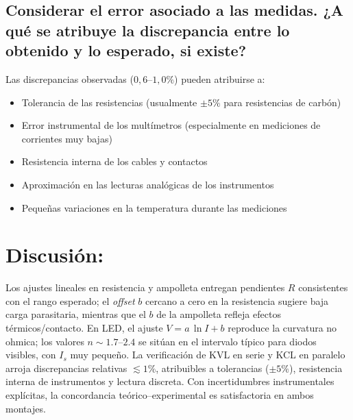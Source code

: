 \documentclass[11pt,twocolumn]{article}
\begin{document}
\subsection{Considerar el error asociado a las medidas. ¿A qué se atribuye la discrepancia entre lo obtenido y lo esperado, si existe?}

Las discrepancias observadas ($0,6$--$1,0\%$) pueden atribuirse a:
\begin{itemize}
\item Tolerancia de las resistencias (usualmente $\pm5\%$ para resistencias de carbón)
\item Error instrumental de los multímetros (especialmente en mediciones de corrientes muy bajas)
\item Resistencia interna de los cables y contactos
\item Aproximación en las lecturas analógicas de los instrumentos
\item Pequeñas variaciones en la temperatura durante las mediciones
\end{itemize}


\section{Discusión:}

Los ajustes lineales en resistencia y ampolleta entregan pendientes $R$ consistentes con el rango esperado; el \emph{offset} $b$ cercano a cero en la resistencia sugiere baja carga parasitaria, mientras que el $b$ de la ampolleta refleja efectos térmicos/contacto. En LED, el ajuste $V=a\,\ln I + b$ reproduce la curvatura no ohmica; los valores $n\sim 1.7\text{--}2.4$ se sitúan en el intervalo típico para diodos visibles, con $I_s$ muy pequeño. La verificación de KVL en serie y KCL en paralelo arroja discrepancias relativas $\lesssim 1\%$, atribuibles a tolerancias ($\pm 5\%$), resistencia interna de instrumentos y lectura discreta. Con incertidumbres instrumentales explícitas, la concordancia teórico–experimental es satisfactoria en ambos montajes.
\end{document}
